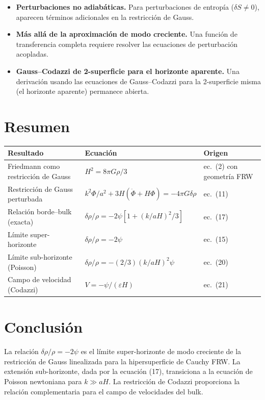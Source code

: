 \documentclass[12pt,a4paper]{article}
\begin{document}
\begin{itemize}
  \item \textbf{Perturbaciones no adiabáticas.} Para perturbaciones de entropía ($\delta S \neq 0$), aparecen términos adicionales en la restricción de Gauss.
  \item \textbf{Más allá de la aproximación de modo creciente.} Una función de transferencia completa requiere resolver las ecuaciones de perturbación acopladas.
  \item \textbf{Gauss--Codazzi de 2-superficie para el horizonte aparente.} Una derivación usando las ecuaciones de Gauss--Codazzi para la 2-superficie misma (el horizonte aparente) permanece abierta.
\end{itemize}

\section{Resumen}

\begin{table}[h]
\centering
\begin{tabular}{lll}
\toprule
Resultado & Ecuación & Origen \\
\midrule
Friedmann como restricción de Gauss & $H^2 = 8\pi G\rho/3$ & ec.~(2) con geometría FRW \\
Restricción de Gauss perturbada & $k^2\Phi/a^2 + 3H(\dot\Phi+H\Phi) = -4\pi G\delta\rho$ & ec.~(11) \\
Relación borde--bulk (exacta) & $\delta\rho/\rho = -2\psi[1 + (k/aH)^2/3]$ & ec.~(17) \\
Límite super-horizonte & $\delta\rho/\rho = -2\psi$ & ec.~(15) \\
Límite sub-horizonte (Poisson) & $\delta\rho/\rho = -(2/3)(k/aH)^2\psi$ & ec.~(20) \\
Campo de velocidad (Codazzi) & $V = -\psi/(\varepsilon H)$ & ec.~(21) \\
\bottomrule
\end{tabular}
\end{table}

\section{Conclusión}

La relación $\delta\rho/\rho = -2\psi$ es el límite super-horizonte de modo creciente de la restricción de Gauss linealizada para la hipersuperficie de Cauchy FRW. La extensión sub-horizonte, dada por la ecuación (17), transiciona a la ecuación de Poisson newtoniana para $k \gg aH$. La restricción de Codazzi proporciona la relación complementaria para el campo de velocidades del bulk.
\end{document}
